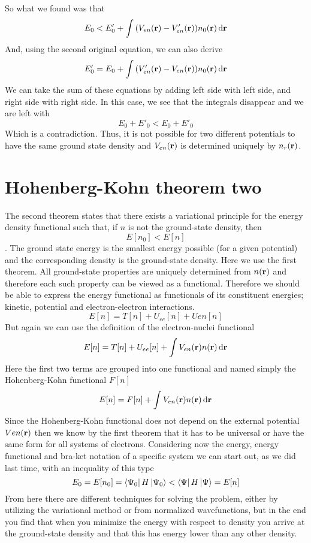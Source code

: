 \documentclass{article}
\begin{document}
	So what we found was that
	\begin{equation}
		E_0 < E'_0 + \int \qty(V_{en}(\vb{r})-V'_{en}(\vb{r}))n_0(\vb{r})\dd{\vb{r}}
	\end{equation}
	And, using the second original equation, we can also derive
	\begin{equation}
		E'_0 = E_0 + \int \qty(V'_{en}(\vb{r})-V_{en}(\vb{r}))n_0(\vb{r})\dd{\vb{r}}
	\end{equation}
	We can take the sum of these equations by adding left side with left side, and right side with right side. In this case, we see that the integrals disappear and we are left with
	$$ E_0+E'_0 < E_0 +E'_0 $$
	Which is a contradiction. Thus, it is not possible for two different potentials to have the same ground state density and $V_{en}(\vb{r})$ is determined uniquely by $n_r(\vb{r})$.
	
	\section{Hohenberg-Kohn theorem two}
	The second theorem states that there exists a variational principle for the energy density functional such that, if $n$ is not the ground-state density, then $$E[n_0] < E[n]$$. The ground state energy is the smallest energy possible (for a given potential) and the corresponding density is the ground-state density.
	Here we use the first theorem. All ground-state properties are uniquely determined from $n(\vb{r})$ and therefore each such property can be viewed as a functional. Therefore we should be able to express the energy functional as functionals of its constituent energies; kinetic, potential and electron-electron interactions.
	$$E[n] = T[n]+U_{ee}[n]+U{en}[n]$$
	But again we can use the definition of the electron-nuclei functional
	$$E[n] = T[n]+U_{ee}[n]+\int V_{en}(\vb{r})n(\vb{r})\dd{\vb{r}}$$
	Here the first two terms are grouped into one functional and named simply the Hohenberg-Kohn functional $F[n]$
	$$E[n] = F[n]+\int V_{en}(\vb{r})n(\vb{r})\dd{\vb{r}}$$
	Since the Hohenberg-Kohn functional does not depend on the external potential $V{en}(\vb{r})$ then we know by the first theorem that it has to be universal or have the same form for all systems of electrons. Considering now the energy, energy functional and bra-ket notation of a specific system we can start out, as we did last time, with an inequality of this type
	$$ E_0 = E[n_0]=\bra{\Psi_0}H\ket{\Psi_0}<\bra{\Psi}H\ket{\Psi} = E[n] $$
	From here there are different techniques for solving the problem, either by utilizing the variational method or from normalized wavefunctions, but in the end you find that when you minimize the energy with respect to density you arrive at the ground-state density and that this has energy lower than any other density. 
\end{document}
